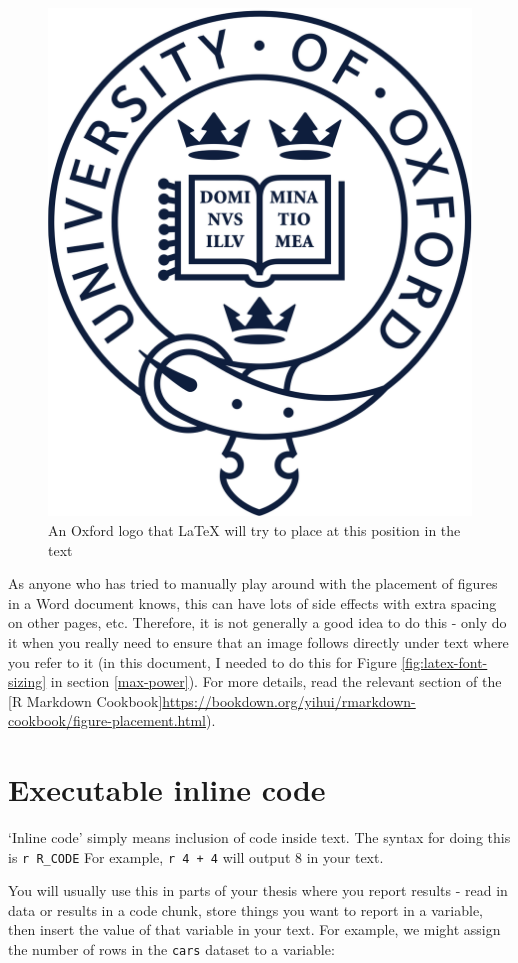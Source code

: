 \documentclass[a4paper, nobind]{templates/ociamthesis}
\begin{document}
\begin{figure}[H]

{\centering \includegraphics[width=0.5\linewidth]{figures/sample-content/beltcrest} 

}

\caption{An Oxford logo that LaTeX will try to place at this position in the text}\label{fig:oxford-logo-controlled}
\end{figure}

As anyone who has tried to manually play around with the placement of figures in a Word document knows, this can have lots of side effects with extra spacing on other pages, etc.
Therefore, it is not generally a good idea to do this - only do it when you really need to ensure that an image follows directly under text where you refer to it (in this document, I needed to do this for Figure \ref{fig:latex-font-sizing} in section \ref{max-power}).
For more details, read the relevant section of the {[}R Markdown Cookbook{]}\url{https://bookdown.org/yihui/rmarkdown-cookbook/figure-placement.html}).

\hypertarget{executable-inline-code}{%
\section{Executable inline code}\label{executable-inline-code}}

`Inline code' simply means inclusion of code inside text.
The syntax for doing this is \texttt{\textasciigrave{}r\ R\_CODE\textasciigrave{}}
For example, \texttt{\textasciigrave{}r\ 4\ +\ 4\textasciigrave{}} will output 8 in your text.

You will usually use this in parts of your thesis where you report results - read in data or results in a code chunk, store things you want to report in a variable, then insert the value of that variable in your text.
For example, we might assign the number of rows in the \texttt{cars} dataset to a variable:
\end{document}
